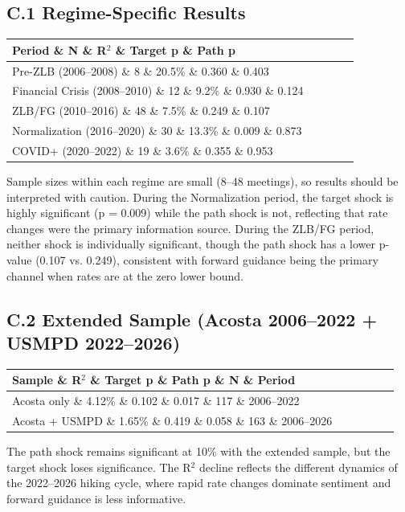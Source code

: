 \documentclass[12pt]{article}
\begin{document}
\subsection{C.1 Regime-Specific Results}

\begin{table}[htbp]
\centering
\begin{tabular}{lcccc}
\toprule
Period \& N \& R$^2$ \& Target p \& Path p \\
\midrule
Pre-ZLB (2006--2008) \& 8 \& 20.5\% \& 0.360 \& 0.403 \\
Financial Crisis (2008--2010) \& 12 \& 9.2\% \& 0.930 \& 0.124 \\
ZLB/FG (2010--2016) \& 48 \& 7.5\% \& 0.249 \& 0.107 \\
Normalization (2016--2020) \& 30 \& 13.3\% \& 0.009 \& 0.873 \\
COVID+ (2020--2022) \& 19 \& 3.6\% \& 0.355 \& 0.953 \\
\bottomrule
\end{tabular}
\end{table}

Sample sizes within each regime are small (8--48 meetings), so results should be interpreted with caution. During the Normalization period, the target shock is highly significant (p = 0.009) while the path shock is not, reflecting that rate changes were the primary information source. During the ZLB/FG period, neither shock is individually significant, though the path shock has a lower p-value (0.107 vs. 0.249), consistent with forward guidance being the primary channel when rates are at the zero lower bound.

\subsection{C.2 Extended Sample (Acosta 2006--2022 + USMPD 2022--2026)}

\begin{table}[htbp]
\centering
\begin{tabular}{lccccc}
\toprule
Sample \& R$^2$ \& Target p \& Path p \& N \& Period \\
\midrule
Acosta only \& 4.12\% \& 0.102 \& 0.017 \& 117 \& 2006--2022 \\
Acosta + USMPD \& 1.65\% \& 0.419 \& 0.058 \& 163 \& 2006--2026 \\
\bottomrule
\end{tabular}
\end{table}

The path shock remains significant at 10\% with the extended sample, but the target shock loses significance. The R$^2$ decline reflects the different dynamics of the 2022--2026 hiking cycle, where rapid rate changes dominate sentiment and forward guidance is less informative.
\end{document}
